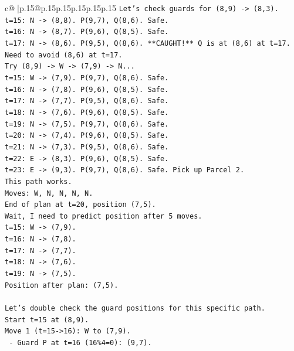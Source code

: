 \documentclass{article}
\begin{document}
{\begin{supertabular}{c@{$\;$}|p{.15\linewidth}@{}p{.15\linewidth}p{.15\linewidth}p{.15\linewidth}p{.15\linewidth}p{.15\linewidth}}
{{{\texttt{Let's check guards for (8,9) {-}> (8,3).} \\
\texttt{t=15: N {-}> (8,8). P(9,7), Q(8,6). Safe.} \\
\texttt{t=16: N {-}> (8,7). P(9,6), Q(8,5). Safe.} \\
\texttt{t=17: N {-}> (8,6). P(9,5), Q(8,6). **CAUGHT!** Q is at (8,6) at t=17.} \\
\texttt{Need to avoid (8,6) at t=17.} \\
\texttt{Try (8,9) {-}> W {-}> (7,9) {-}> N...} \\
\texttt{t=15: W {-}> (7,9). P(9,7), Q(8,6). Safe.} \\
\texttt{t=16: N {-}> (7,8). P(9,6), Q(8,5). Safe.} \\
\texttt{t=17: N {-}> (7,7). P(9,5), Q(8,6). Safe.} \\
\texttt{t=18: N {-}> (7,6). P(9,6), Q(8,5). Safe.} \\
\texttt{t=19: N {-}> (7,5). P(9,7), Q(8,6). Safe.} \\
\texttt{t=20: N {-}> (7,4). P(9,6), Q(8,5). Safe.} \\
\texttt{t=21: N {-}> (7,3). P(9,5), Q(8,6). Safe.} \\
\texttt{t=22: E {-}> (8,3). P(9,6), Q(8,5). Safe.} \\
\texttt{t=23: E {-}> (9,3). P(9,7), Q(8,6). Safe. Pick up Parcel 2.} \\
\texttt{This path works.} \\
\texttt{Moves: W, N, N, N, N.} \\
\texttt{End of plan at t=20, position (7,5).} \\
\texttt{Wait, I need to predict position after 5 moves.} \\
\texttt{t=15: W {-}> (7,9).} \\
\texttt{t=16: N {-}> (7,8).} \\
\texttt{t=17: N {-}> (7,7).} \\
\texttt{t=18: N {-}> (7,6).} \\
\texttt{t=19: N {-}> (7,5).} \\
\texttt{Position after plan: (7,5).} \\
\\ 
\texttt{Let's double check the guard positions for this specific path.} \\
\texttt{Start t=15 at (8,9).} \\
\texttt{Move 1 (t=15{-}>16): W to (7,9).} \\
\texttt{  {-} Guard P at t=16 (16\%4=0): (9,7).} \\
}}}
\end{supertabular}}
\end{document}
